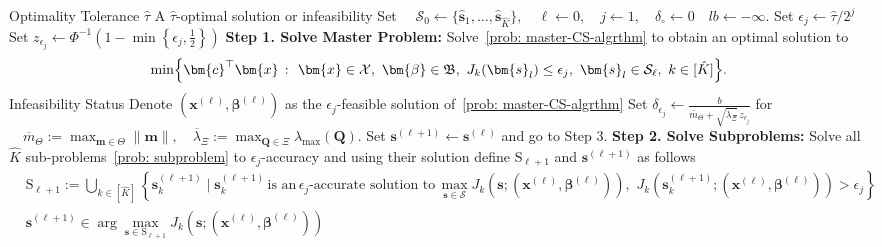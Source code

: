 \documentclass[opre,sglanonrev]{informs4}
\newcommand{\mS}{\mathcal{S}}
\newcommand{\mX}{\mathcal{X}}
\newcommand{\mfB}{\mathfrak{B}}
\newcommand{\bbeta}{\bm{\beta}}
\newcommand{\bmean}{\bm{m}}
\newcommand{\bc}{\bm{c}}
\newcommand{\bs}{\bm{s}}
\newcommand{\bx}{\bm{x}}
\newcommand{\bQ}{\bm Q}
\begin{document}
{\begin{algorithm}[t]
\scriptsize
  \caption{A cutting‐surface algorithm (CSA) to solve~\eqref{prob: DR-CCP-GMM}.}
  \label{alg: cutting-surface}
  \begin{algorithmic}[1]
    \Require Optimality Tolerance $\hat{\tau}$
    \Ensure A $\hat{\tau}$-optimal solution or infeasibility
    \State Set $\quad \mS_0 \gets \{\hat{\bs}_1,\ldots,\hat{\bs}_{\hat K}\},\quad \ell \gets 0, \quad j \gets 1, \quad \delta_\circ \gets 0 \quad lb \gets -\infty.$
      \State Set $\epsilon_j \gets \hat{\tau}/2^j$
      \State Set $z_{\epsilon_j}
\gets\Phi^{-1}(1-\min\left\{\epsilon_j,\frac12\right\})$
      \State \textbf{Step 1. Solve Master Problem:} Solve~\eqref{prob: master-CS-algrthm} to obtain an optimal solution to
      \begin{align}\label{prob: master-CS-algrthm}
        \min\Bigl\{\bc^\top \bx \ \colon\ \bx \in \mX,\ \bbeta \in \mfB,\ 
        J_k(\bs_l)\le \epsilon_j,\ \bs_l \in \mS_\ell,\ k\in[\hat{K}]\Bigr\}.
      \end{align}
        \State \Return Infeasibility Status
      \EndIf
      \State Denote $(\bx^{(\ell)},\bbeta^{(\ell)})$ as the $\epsilon_j$-feasible solution of~\eqref{prob: master-CS-algrthm}
      \State Set $
\delta_{\epsilon_j}
\gets
\frac{b}{\overline{m}_\Theta+\sqrt{\overline{\lambda}_\Xi}\,z_{\epsilon_j}}$ for 
\(\quad\overline{m}_\Theta:=\max_{\bmean\in\Theta}\|\bmean\|,
\quad \overline{\lambda}_\Xi
:=
\max_{\bQ\in\Xi}\lambda_{\max}(\bQ)\).
    \If{$\|\bx^{(\ell)}\|\le \delta_{\epsilon_j}$}
        \State Set $\bs^{(\ell+1)}\gets \bs^{(\ell)}$ and go to Step 3.
    \EndIf
      \State \textbf{Step 2. Solve Subproblems:}  Solve all $\hat{K}$ sub-problems~\eqref{prob: subproblem} to $\epsilon_j$-accuracy and using their solution define $\mathrm{S}_{\ell+1}$ and $\bs^{(\ell+1)}$ as follows
\begin{align*}
&   \mathrm{S}_{\ell+1}
:= \bigcup_{k\in[\hat K]}
\left\{\bs^{(\ell+1)}_k \mid \bs^{(\ell+1)}_k \, \text{is an}\, \epsilon_j\text{-accurate solution to} \,  \max_{\bs\in\mS} J_k\!\left(\bs;(\bx^{(\ell)},\bbeta^{(\ell)})\right), \,\, 
J_k\!\left(\bs^{(\ell+1)}_k;(\bx^{(\ell)},\bbeta^{(\ell)})\right)>\epsilon_j
\right\} \\
& 
\bs^{(\ell+1)}\in \arg\max_{\bs\in \mathrm{S}_{\ell+1}} 
J_k\!\left(\bs;(\bx^{(\ell)},\bbeta^{(\ell)})\right)

\end{align*}
\end{algorithmic}
\end{algorithm}}
\end{document}
